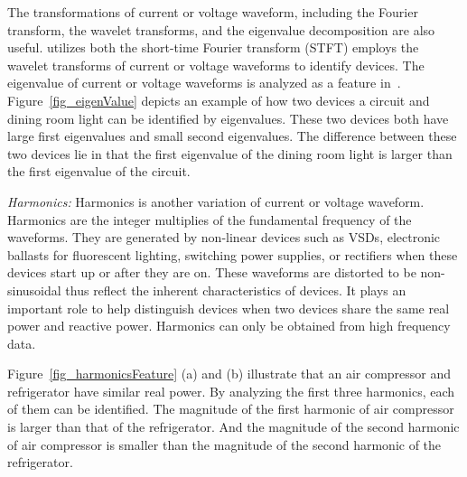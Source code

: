 The transformations of 
current or voltage waveform, including the Fourier transform, 
 the wavelet transforms, 
and the eigenvalue decomposition are also useful. 
\cite{su2011feature} utilizes both the short-time Fourier transform (STFT) %
\cite{chan2000harmonics} employs the wavelet transforms of current or voltage waveforms 
to identify devices. 
The eigenvalue of current or voltage waveforms is analyzed
as a feature in~\cite{liang2010load}. 
Figure~\ref{fig_eigenValue} depicts an example of how
two devices a circuit and dining room light
can be identified by eigenvalues.
These two devices both
have large first eigenvalues and small second eigenvalues. 
The difference between these two devices lie in that 
the first eigenvalue of the dining room light is larger than the first 
eigenvalue of the circuit. 


\textit{Harmonics:}
Harmonics is another variation of current or voltage waveform. 
Harmonics are the integer multiplies of the fundamental frequency of the waveforms. 
They are generated by non-linear devices such as VSDs,
electronic ballasts for fluorescent lighting,
switching power supplies, or rectifiers
when these devices start up or after they are on.
These waveforms are distorted to
be non-sinusoidal thus reflect the inherent characteristics
of devices.
It plays an important role to help distinguish devices
when two devices share the same real power and reactive power. 
Harmonics can only be obtained from high frequency 
 data. 

Figure~\ref{fig_harmonicsFeature} (a) and (b) illustrate that 
an air compressor and refrigerator have similar real power. 
By analyzing the first three harmonics, 
each of them can be identified. 
The magnitude of the first harmonic of air compressor is larger than 
that of the refrigerator. 
And the magnitude of the second harmonic of air compressor is smaller than 
the magnitude of the second harmonic of the refrigerator. 


